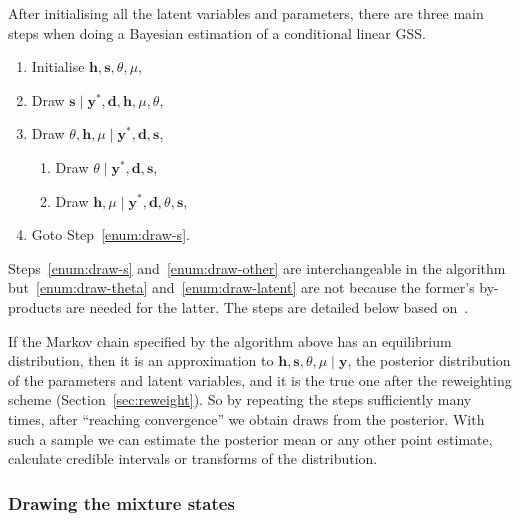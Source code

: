 After initialising all the latent variables and parameters, there are three main steps when doing a Bayesian estimation of a conditional linear GSS.
\begin{enumerate}[start=0]
	\item Initialise $\bm h,\bm s,\theta,\mu$,
	\item Draw $\bm{s}\mid\bm{y}^\ast,\bm{d},\bm{h},\mu,\theta$\label{enum:draw-s},
	\item Draw $\theta,\bm h,\mu\mid\bm y^\ast,\bm d,\bm s$\label{enum:draw-other},
	\begin{enumerate}
		\item Draw $\theta\mid\bm{y}^\ast,\bm{d},\bm s$\label{enum:draw-theta},
		\item Draw $\bm{h},\mu\mid\bm{y}^\ast,\bm{d},\theta,\bm s$\label{enum:draw-latent},
	\end{enumerate}
	\item Goto Step~\ref{enum:draw-s}.
\end{enumerate}
Steps~\ref{enum:draw-s} and~\ref{enum:draw-other} are interchangeable in the algorithm but~\ref{enum:draw-theta} and~\ref{enum:draw-latent} are not because the former's by-products are needed for the latter.
The steps are detailed below based on~\citet{Omori2007}.

If the Markov chain specified by the algorithm above has an equilibrium distribution, then it is an approximation to $\bm h,\bm s,\theta,\mu\mid\bm y$, the posterior distribution of the parameters and latent variables, and it is the true one after the reweighting scheme (Section~\ref{sec:reweight}).
So by repeating the steps sufficiently many times, after ``reaching convergence'' we obtain draws from the posterior.
With such a sample we can estimate the posterior mean or any other point estimate, calculate credible intervals or transforms of the distribution.

\subsubsection{Drawing the mixture states}

